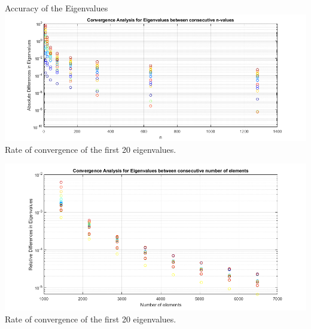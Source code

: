 \documentclass[8pt]{beamer}
\begin{document}
        \begin{frame}{Accuracy of the Eigenvalues}
            \centering
            \includegraphics[scale=0.3]{Convergence.png} \\ %
            \footnotesize Rate of convergence of the first 20 eigenvalues.

            \centering
            \includegraphics[scale=0.3]{convergence3d.png} \\ %
            \footnotesize Rate of convergence of the first 20 eigenvalues.
        \end{frame}
\end{document}
